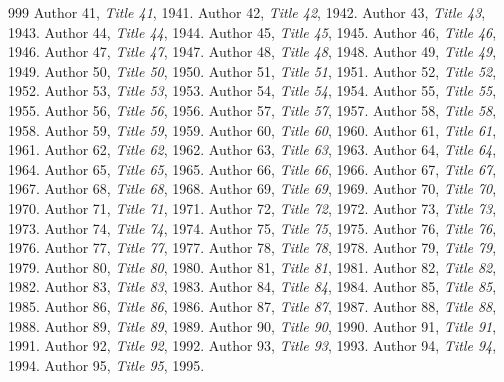 \documentclass[11pt]{article}
\begin{document}
\begin{thebibliography}{999}
 Author 41, \emph{Title 41}, 1941.
 Author 42, \emph{Title 42}, 1942.
 Author 43, \emph{Title 43}, 1943.
 Author 44, \emph{Title 44}, 1944.
 Author 45, \emph{Title 45}, 1945.
 Author 46, \emph{Title 46}, 1946.
 Author 47, \emph{Title 47}, 1947.
 Author 48, \emph{Title 48}, 1948.
 Author 49, \emph{Title 49}, 1949.
 Author 50, \emph{Title 50}, 1950.
 Author 51, \emph{Title 51}, 1951.
 Author 52, \emph{Title 52}, 1952.
 Author 53, \emph{Title 53}, 1953.
 Author 54, \emph{Title 54}, 1954.
 Author 55, \emph{Title 55}, 1955.
 Author 56, \emph{Title 56}, 1956.
 Author 57, \emph{Title 57}, 1957.
 Author 58, \emph{Title 58}, 1958.
 Author 59, \emph{Title 59}, 1959.
 Author 60, \emph{Title 60}, 1960.
 Author 61, \emph{Title 61}, 1961.
 Author 62, \emph{Title 62}, 1962.
 Author 63, \emph{Title 63}, 1963.
 Author 64, \emph{Title 64}, 1964.
 Author 65, \emph{Title 65}, 1965.
 Author 66, \emph{Title 66}, 1966.
 Author 67, \emph{Title 67}, 1967.
 Author 68, \emph{Title 68}, 1968.
 Author 69, \emph{Title 69}, 1969.
 Author 70, \emph{Title 70}, 1970.
 Author 71, \emph{Title 71}, 1971.
 Author 72, \emph{Title 72}, 1972.
 Author 73, \emph{Title 73}, 1973.
 Author 74, \emph{Title 74}, 1974.
 Author 75, \emph{Title 75}, 1975.
 Author 76, \emph{Title 76}, 1976.
 Author 77, \emph{Title 77}, 1977.
 Author 78, \emph{Title 78}, 1978.
 Author 79, \emph{Title 79}, 1979.
 Author 80, \emph{Title 80}, 1980.
 Author 81, \emph{Title 81}, 1981.
 Author 82, \emph{Title 82}, 1982.
 Author 83, \emph{Title 83}, 1983.
 Author 84, \emph{Title 84}, 1984.
 Author 85, \emph{Title 85}, 1985.
 Author 86, \emph{Title 86}, 1986.
 Author 87, \emph{Title 87}, 1987.
 Author 88, \emph{Title 88}, 1988.
 Author 89, \emph{Title 89}, 1989.
 Author 90, \emph{Title 90}, 1990.
 Author 91, \emph{Title 91}, 1991.
 Author 92, \emph{Title 92}, 1992.
 Author 93, \emph{Title 93}, 1993.
 Author 94, \emph{Title 94}, 1994.
 Author 95, \emph{Title 95}, 1995.

\end{thebibliography}
\end{document}
